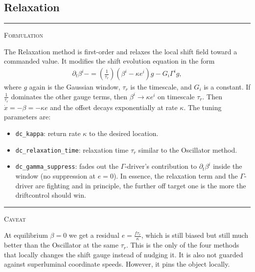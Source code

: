 \documentclass{article}
\newcommand{\var}[1]{%
  {\setlength{\fboxsep}{1.5pt}%
   \colorbox{varbg}{\textcolor{varfg}{\texttt{\small #1}}}}}
\newcommand{\step}[1]{%
  \par\medskip\noindent
  {\color{stepfg}\rule[-0.15ex]{2pt}{1.5ex}\hspace{0.5em}\scshape #1}%
  \hspace{0.75em}\ignorespaces}
\begin{document}
\subsection*{Relaxation}
\step{Formulation} The Relaxation method is first-order and relaxes the local shift field toward a commanded value. It modifies the shift evolution equation in the form
\begin{align}
  \partial_t \beta^i-=\left(\frac{1}{\tau_r}\right)\left(\beta^i-\kappa e^i\right)g-G_i\Gamma^ig,
\end{align}
where $g$ again is the Gaussian window, $\tau_r$ is the timescale, and $G_i$ is a constant. If $\frac{1}{\tau_r}$ dominates the other gauge terms, then
$\beta^i\rightarrow\kappa e^i$ on timescale $\tau_r$. Then $\Dot{x}=-\beta=-\kappa e$ and the offset decays exponentially at rate $\kappa$. The tuning parameters are:
\begin{itemize}
  \item \var{dc\_kappa}: return rate $\kappa$ to the desired location.
  \item \var{dc\_relaxation\_time}: relaxation time $\tau_r$ similar to the Oscillator method.
  \item \var{dc\_gamma\_suppress}: fades out the $\Gamma$-driver's contribution to $\partial_t\beta^i$ inside the window (no suppression at $e=0$). In essence, the
  relaxation term and the $\Gamma$-driver are fighting and in principle, the further off target one is the more the driftcontrol should win.
\end{itemize}
\step{Caveat} At equilibrium $\beta=0$ we get a residual $e=\frac{f\tau_r}{\kappa}$, which is still biased but still much better than the Oscillator at the
same $\tau_r$. This is the only of the four methods that locally changes the shift gauge instead of nudging it. It is also not guarded against superluminal
coordinate speeds. However, it pins the object locally.
\end{document}
